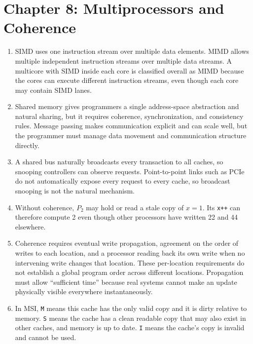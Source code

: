 \documentclass[11pt]{article}
\begin{document}
\section{Chapter 8: Multiprocessors and Coherence}
\begin{enumerate}
    \item SIMD uses one instruction stream over multiple data elements.
    MIMD allows multiple independent instruction streams over multiple data streams.
    A multicore with SIMD inside each core is classified overall as MIMD because the cores can execute different instruction streams, even though each core may contain SIMD lanes.

    \item Shared memory gives programmers a single address-space abstraction and natural sharing, but it requires coherence, synchronization, and consistency rules.
    Message passing makes communication explicit and can scale well, but the programmer must manage data movement and communication structure directly.

    \item A shared bus naturally broadcasts every transaction to all caches, so snooping controllers can observe requests.
    Point-to-point links such as PCIe do not automatically expose every request to every cache, so broadcast snooping is not the natural mechanism.

    \item Without coherence, \(P_2\) may hold or read a stale copy of \(x=1\).
    Its \texttt{x++} can therefore compute 2 even though other processors have written 22 and 44 elsewhere.

    \item Coherence requires eventual write propagation, agreement on the order of writes to each location, and a processor reading back its own write when no intervening write changes that location.
    These per-location requirements do not establish a global program order across different locations.
    Propagation must allow ``sufficient time'' because real systems cannot make an update physically visible everywhere instantaneously.

    \item In MSI, \texttt{M} means this cache has the only valid copy and it is dirty relative to memory.
    \texttt{S} means the cache has a clean readable copy that may also exist in other caches, and memory is up to date.
    \texttt{I} means the cache's copy is invalid and cannot be used.


\end{enumerate}
\end{document}
